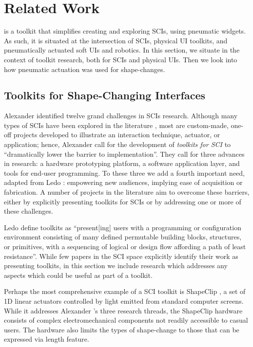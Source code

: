   \section{Related Work}
    \mp is a toolkit that simplifies creating and exploring SCIs, using
    pneumatic widgets. As such, it is situated at the intersection of
    SCIs, physical UI toolkits, and pneumatically actuated soft UIs and
    robotics. In this section, we situate \mp in the context of toolkit
    research, both for SCIs and physical UIs. Then we look into how
    pneumatic actuation was used for shape-changes.
    
    \subsection{Toolkits for Shape-Changing Interfaces}
      Alexander \etal \cite{Alexander:2018} identified twelve grand
      challenges in SCIs research. Although many types of SCIs have been
      explored in the literature \cite{Sturdee:2018ce}, most are custom-made,
      one-off projects developed to illustrate an interaction technique,
      actuator, or application; hence, Alexander \etal
      \cite{Alexander:2018} call for the development of
      \textit{toolkits for SCI} to ``dramatically lower the barrier to
      implementation''. They call for three advances in research: a hardware
      prototyping platform, a software application layer, and tools for end-user
      programming. To these three we add a fourth important need, adapted from
      Ledo \etal \cite{Ledo:2018a}: empowering new audiences, implying ease of
      acquisition or fabrication. A number of projects in the literature aim to
      overcome these barriers, either by explicitly presenting toolkits for SCIs
      or by addressing one or more of these challenges.
      
      Ledo \etal \cite{Ledo:2018a} define toolkits as ``present[ing] users with
      a programming or configuration environment consisting of many defined
      permutable building blocks, structures, or primitives, with a sequencing
      of logical or design flow affording a path of least resistance''. While
      few papers in the SCI space explicitly identify their work as presenting
      toolkits, in this section we include research which addresses any aspects
      which could be useful as part of a toolkit.
      
      Perhaps the most comprehensive example of a SCI toolkit is ShapeClip
      \cite{Hardy:2015dx}, a set of 1D linear actuators controlled by light
      emitted from standard computer screens. While it addresses Alexander
      \etal's three research threads, the ShapeClip hardware consists of complex
      electromechanical components not readily accessible to casual users. The
      hardware also limits the types of shape-change to those that can be
      expressed via length feature.
      
